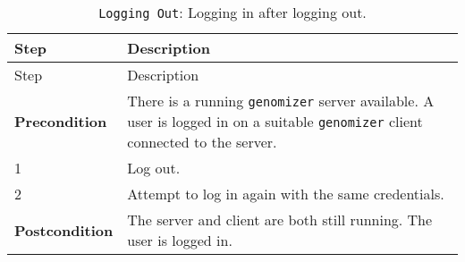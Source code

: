 \begin{longtable}[c]{@{}ll@{}}
\caption{\texttt{Logging\ Out}: Logging in after logging
out.}\tabularnewline
\toprule
\begin{minipage}[b]{0.31\columnwidth}\raggedright\strut
Step
\strut\end{minipage} &
\begin{minipage}[b]{0.63\columnwidth}\raggedright\strut
Description
\strut\end{minipage}\tabularnewline
\midrule
\endfirsthead
\toprule
\begin{minipage}[b]{0.31\columnwidth}\raggedright\strut
Step
\strut\end{minipage} &
\begin{minipage}[b]{0.63\columnwidth}\raggedright\strut
Description
\strut\end{minipage}\tabularnewline
\midrule
\endhead
\begin{minipage}[t]{0.31\columnwidth}\raggedright\strut
\textbf{Precondition}
\strut\end{minipage} &
\begin{minipage}[t]{0.63\columnwidth}\raggedright\strut
There is a running \texttt{genomizer} server available. A user is logged
in on a suitable \texttt{genomizer} client connected to the server.
\strut\end{minipage}\tabularnewline
\begin{minipage}[t]{0.31\columnwidth}\raggedright\strut
1
\strut\end{minipage} &
\begin{minipage}[t]{0.63\columnwidth}\raggedright\strut
Log out.
\strut\end{minipage}\tabularnewline
\begin{minipage}[t]{0.31\columnwidth}\raggedright\strut
2
\strut\end{minipage} &
\begin{minipage}[t]{0.63\columnwidth}\raggedright\strut
Attempt to log in again with the same credentials.
\strut\end{minipage}\tabularnewline
\begin{minipage}[t]{0.31\columnwidth}\raggedright\strut
\textbf{Postcondition}
\strut\end{minipage} &
\begin{minipage}[t]{0.63\columnwidth}\raggedright\strut
The server and client are both still running. The user is logged in.
\strut\end{minipage}\tabularnewline
\bottomrule
\end{longtable}

